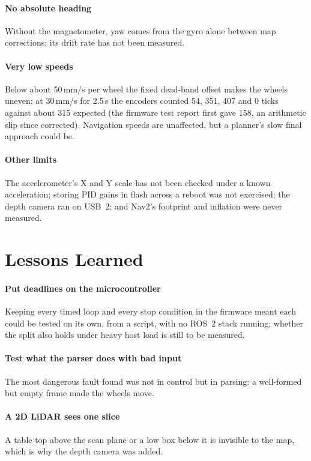 \documentclass[11pt]{article}
\begin{document}
\paragraph{No absolute heading} Without the magnetometer, yaw comes from the gyro alone between map corrections; its drift rate has not been measured.

\paragraph{Very low speeds} Below about 50\,mm/s per wheel the fixed dead-band offset makes the wheels uneven: at 30\,mm/s for 2.5\,s the encoders counted 54, 351, 407 and 0 ticks against about 315 expected (the firmware test report first gave 158, an arithmetic slip since corrected). Navigation speeds are unaffected, but a planner's slow final approach could be.

\paragraph{Other limits} The accelerometer's X and Y scale has not been checked under a known acceleration; storing PID gains in flash across a reboot was not exercised; the depth camera ran on USB~2; and Nav2's footprint and inflation were never measured.

\section{Lessons Learned}

\paragraph{Put deadlines on the microcontroller} Keeping every timed loop and every stop condition in the firmware meant each could be tested on its own, from a script, with no ROS~2 stack running; whether the split also holds under heavy host load is still to be measured.

\paragraph{Test what the parser does with bad input} The most dangerous fault found was not in control but in parsing: a well-formed but empty frame made the wheels move.

\paragraph{A 2D LiDAR sees one slice} A table top above the scan plane or a low box below it is invisible to the map, which is why the depth camera was added.
\end{document}
